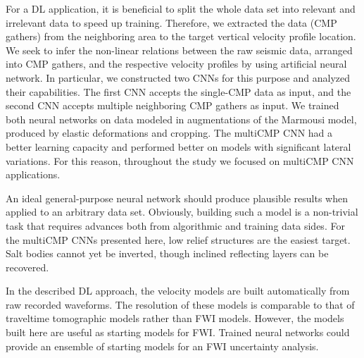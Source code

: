 \documentclass[paper,twocolomn]{geophysics}
\begin{document}
For a DL application, it is beneficial to split the whole data set into relevant and irrelevant data to speed up training. Therefore, we extracted the data (CMP gathers) from the neighboring area to the target vertical velocity profile location. 
We seek to infer the non-linear relations between the raw seismic data, arranged into CMP gathers, and the respective velocity profiles by using artificial neural network. In particular, we constructed two CNNs for this purpose and analyzed their capabilities.
The first CNN accepts the single-CMP data as input, and the second CNN accepts multiple neighboring CMP gathers as input. We trained both neural networks on data modeled in augmentations of the Marmousi model, produced by elastic deformations and cropping. The multiCMP CNN had a better learning capacity and performed better on models with significant lateral variations. For this reason, throughout the study we focused on multiCMP CNN applications. 


An ideal general-purpose neural network should produce plausible results when applied to an arbitrary data set. Obviously, building such a model is a non-trivial task that requires advances both from algorithmic and training data sides. For the multiCMP CNNs presented here, low relief structures are the easiest target. Salt bodies cannot yet be inverted, though inclined reflecting layers can be recovered.

In the described DL approach, the velocity models are built automatically from raw recorded waveforms. The resolution of these models is comparable to that of traveltime tomographic models rather than FWI models. However, the models built here are useful as starting models for FWI. Trained neural networks could provide an ensemble of starting models for an FWI uncertainty analysis.
\end{document}
